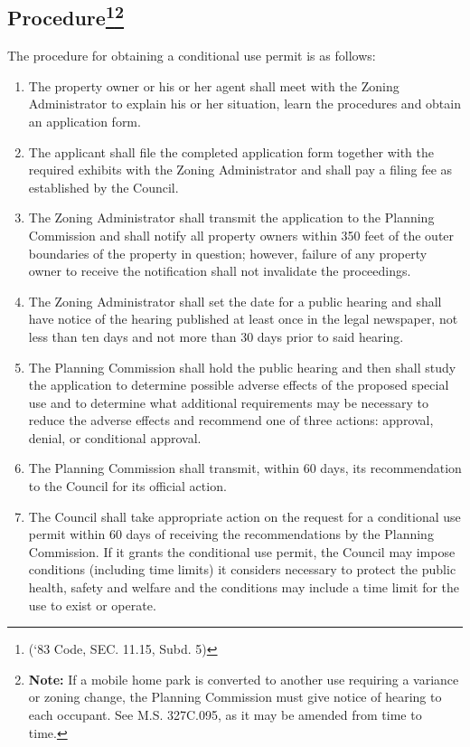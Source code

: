 \subsection{Procedure\footnote{(‘83 Code, SEC. 11.15, Subd. 5)}\footnote{\textbf{Note:} If a mobile home park is converted to another use requiring a variance or zoning change, the Planning Commission must give notice of hearing to each occupant. See M.S. \textsection 327C.095, as it may be amended from time to time.}}
The procedure for obtaining a conditional use permit is as follows:
\begin{enumerate}[{\indent}1)]
    \item The property owner or his or her agent shall meet with the Zoning Administrator to explain his or her situation, learn the procedures and obtain an application form.
    \item The applicant shall file the completed application form together with the required exhibits with the Zoning Administrator and shall pay a filing fee as established by the Council.
    \item The Zoning Administrator shall transmit the application to the Planning Commission and shall notify all property owners within 350 feet of the outer boundaries of the property in question; however, failure of any property owner to receive the notification shall not invalidate the proceedings.
    \item The Zoning Administrator shall set the date for a public hearing and shall have notice of the hearing published at least once in the legal newspaper, not less than ten days and not more than 30 days prior to said hearing.
    \item The Planning Commission shall hold the public hearing and then shall study the application to determine possible adverse effects of the proposed special use and to determine what additional requirements may be necessary to reduce the adverse effects and recommend one of three actions:  approval, denial, or conditional approval.
    \item The Planning Commission shall transmit, within 60 days, its recommendation to the Council for its official action.
    \item The Council shall take appropriate action on the request for a conditional use permit within 60 days of receiving the recommendations by the Planning Commission. If it grants the conditional use permit, the Council may impose conditions (including time limits) it considers necessary to protect the public health, safety and welfare and the conditions may include a time limit for the use to exist or operate.

\end{enumerate}
